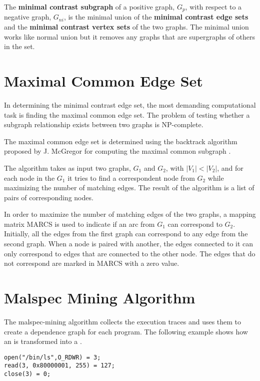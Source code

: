 The \textbf{minimal contrast subgraph} of a positive graph, $G_{p}$, with respect to a negative graph, $G_{ni}$, is the minimal union of the \textbf{minimal contrast edge sets} and the \textbf{minimal contrast vertex sets} of the two graphs. The minimal union works like normal union but it removes any graphs that are supergraphs of others in the set.

\section{Maximal Common Edge Set}
\label{third:maximal-common-edge-set}

In determining the minimal contrast edge set, the most demanding computational task is finding the maximal common edge set. The problem of testing whether a subgraph relationship exists between two graphs is NP-complete.

The maximal common edge set is determined using the backtrack algorithm proposed by J. McGregor for computing the maximal common subgraph \cite{common-subgraph}. 

The algorithm takes as input two graphs, $G_{1}$ and $G_{2}$, with $|V_{1}| < |V_{2}|$, and for each node in the $G_{1}$ it tries to find a correspondent node from $G_{2}$ while maximizing the number of matching edges. The result of the algorithm is a list of pairs of corresponding nodes.

In order to maximize the number of matching edges of the two graphs, a mapping matrix MARCS is used to indicate if an arc from $G_{1}$ can correspond to $G_{2}$. Initially, all the edges from the first graph can correspond to any edge from the second graph. When a node is paired with another, the edges connected to it can only correspond to edges that are connected to the other node. The edges that do not correspond are marked in MARCS with a zero value.

\section{Malspec Mining Algorithm}
\label{third:malspec-algorithm}	

The malspec-mining algorithm collects the execution traces and uses them to create a dependence graph for each program. The following example shows how an  is transformed into a .

\lstset{language=C,caption=System call trace,label=lst:syscall-trace}
\begin{lstlisting}
open("/bin/ls",O_RDWR) = 3;
read(3, 0x80000001, 255) = 127;
close(3) = 0;
\end{lstlisting}

